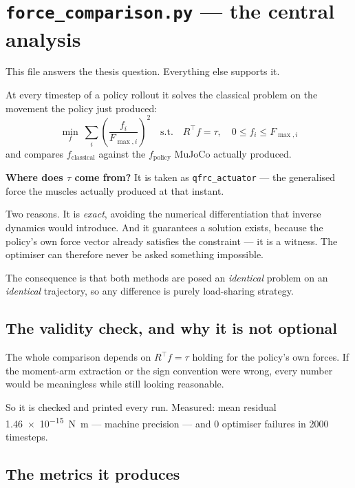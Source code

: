 \section{\texttt{force\_comparison.py} --- the central analysis}

This file answers the thesis question. Everything else supports it.

At every timestep of a policy rollout it solves the classical problem on the
movement the policy just produced:
\[
\min_{f}\ \sum_i \left(\frac{f_i}{F_{\max,i}}\right)^2 \quad\text{s.t.}\quad R^\top f = \tau,\quad 0 \le f_i \le F_{\max,i}
\]
and compares $f_{\text{classical}}$ against the $f_{\text{policy}}$ MuJoCo
actually produced.

\begin{why}
\textbf{Where does $\tau$ come from?} It is taken as \texttt{qfrc\_actuator} ---
the generalised force the muscles actually produced at that instant.

Two reasons. It is \emph{exact}, avoiding the numerical differentiation that
inverse dynamics would introduce. And it guarantees a solution exists, because
the policy's own force vector already satisfies the constraint --- it is a
witness. The optimiser can therefore never be asked something impossible.

The consequence is that both methods are posed an \emph{identical} problem on an
\emph{identical} trajectory, so any difference is purely load-sharing strategy.
\end{why}

\subsection{The validity check, and why it is not optional}

The whole comparison depends on $R^\top f = \tau$ holding for the policy's own
forces. If the moment-arm extraction or the sign convention were wrong, every
number would be meaningless while still looking reasonable.

So it is checked and printed every run. Measured: mean residual
\SI{1.46e-15}{\newton\meter} --- machine precision --- and 0 optimiser failures
in 2000 timesteps.

\subsection{The metrics it produces}

